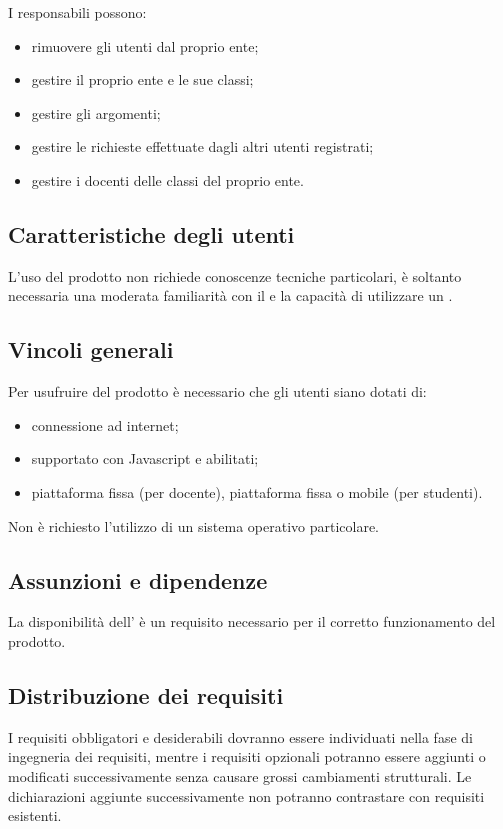 \documentclass[a4paper, titlepage]{article}
\begin{document}
\bigskip

I responsabili possono:
\begin{itemize}
\item rimuovere gli utenti dal proprio ente;
\item gestire il proprio ente e le sue classi;
\item gestire gli argomenti;
\item gestire le richieste effettuate dagli altri utenti registrati;
\item gestire i docenti delle classi del proprio ente.
\end{itemize}

\subsection{Caratteristiche degli utenti}
L'uso del prodotto non richiede conoscenze tecniche particolari, è soltanto necessaria una moderata familiarità con il  e la capacità di utilizzare un .

\subsection{Vincoli generali}
Per usufruire del prodotto è necessario che gli utenti siano dotati di:
\begin{itemize}
\item connessione ad internet;
\item {} supportato con Javascript e  abilitati;
\item piattaforma fissa (per docente), piattaforma fissa o mobile (per studenti).
\end{itemize}

\bigskip

Non è richiesto l'utilizzo di un sistema operativo particolare.

\subsection{Assunzioni e dipendenze}
La disponibilità dell' è un requisito necessario per il corretto funzionamento del prodotto.

\subsection{Distribuzione dei requisiti}
I requisiti obbligatori e desiderabili dovranno essere individuati nella fase di ingegneria dei requisiti, mentre i requisiti opzionali potranno essere aggiunti o modificati successivamente senza causare grossi cambiamenti strutturali. Le dichiarazioni aggiunte successivamente non potranno contrastare con requisiti esistenti.
\end{document}
